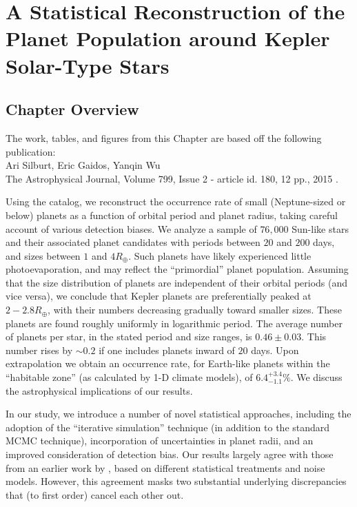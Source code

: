 \chapter[Statistical Reconstruction of Kepler Planets]{A Statistical Reconstruction of the Planet Population around Kepler Solar-Type Stars}
\label{chap:Stats}

\section{Chapter Overview}
	\begin{center}
	\begin{minipage}[c]{4.75in}
	The work, tables, and figures from this Chapter are based off the following publication:\\
	
	Ari Silburt, Eric Gaidos, Yanqin Wu\\
	The Astrophysical Journal, Volume 799, Issue 2 - article id. 180, 12 pp., 2015 \citep{Silburt2015}.
	\vspace{2em}
	\end{minipage}
	\end{center}
  Using the \citet{Ramirez2014} \kep catalog, we reconstruct the
  occurrence rate of small (Neptune-sized or below) planets as a
  function of orbital period and planet radius, taking careful account
  of various detection biases. We analyze a sample of $76,000$
  Sun-like stars and their associated planet candidates with periods
  between $20$ and $200$ days, and sizes between $1$ and $4
  R_\oplus$. Such planets have likely experienced little
  photoevaporation, and may reflect the ``primordial'' planet
  population. Assuming that the size distribution of planets are
  independent of their orbital periods (and vice versa), we
  conclude that Kepler planets are preferentially peaked at $2-2.8
  R_\oplus$, with their numbers decreasing gradually toward smaller
  sizes. These planets are found roughly uniformly in logarithmic
  period. The average number of planets per star, in the stated period
  and size ranges, is $0.46 \pm 0.03$. This number rises by $\sim
    0.2$ if one includes planets inward of $20$ days.
  Upon extrapolation we obtain an occurrence rate, for
    Earth-like planets within the ``habitable zone'' (as calculated by
  1-D climate models), of $6.4^{+3.4}_{-1.1}\%$. We discuss the
  astrophysical implications of our results.

  In our study, we introduce a number of novel statistical approaches,
  including the adoption of the ``iterative simulation'' technique (in
  addition to the standard MCMC technique), incorporation of
  uncertainties in planet radii, and an improved consideration of
  detection bias. Our results largely agree with those from an earlier
  work by \citet{Petigura2013}, based on different statistical
  treatments and noise models. However, this agreement masks two 
  substantial underlying discrepancies that (to first order) cancel each 
  other out.

